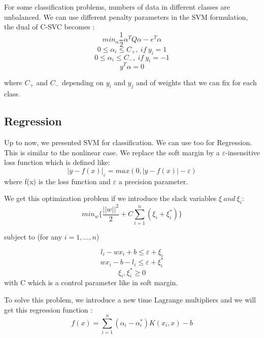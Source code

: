 For some classification problems, numbers of data in different classes are unbalanced. We can use different penalty parameters in the SVM formulation, the dual of C-SVC becomes :
\[min_{\alpha} \frac{1}{2} \alpha^TQ\alpha-e^T\alpha\]
\[0\leq \alpha_i \leq C_+,\ if\ y_i=1\]
\[0\leq \alpha_i \leq C_-,\ if\ y_i=-1\]
\[y^T\alpha=0\]

where $C_+$ and $C_-$ depending on $y_i$ and $y_j$ and of weights that we can fix for each class.

\subsection{Regression }
Up to now, we presented SVM for classification. We can use too for Regression. This is similar to the nonlinear case. We replace the soft margin by 
a $\varepsilon$-insensitive loss function which is defined like:
\[|y-f(x)|_\varepsilon = max(0,|y-f(x)|-\varepsilon)\]
where f(x) is the loss function and $\varepsilon$ a precision parameter.

We get this optimization problem if we introduce the slack variables $\xi\ and\ \xi_i$:
\[min_w \{\frac{||w||^2}{2}+C\sum_{i=1}^n(\xi_i+\xi_i^*) \}\]
\begin{center}subject to (for any $i=1,...,n$)\end{center}
\[l_i-wx_i+b\leq \varepsilon+\xi_i\]
\[wx_i-b-l_i\leq \varepsilon +\xi_i^*\]
\[\xi_i,\xi_i^* \geq 0\]
with C which is a control parameter like in soft margin. 

To solve this problem, we introduce a new time Lagrange multipliers and we will get this regression function :
\[f(x)=\sum_{i=1}^n(\alpha_i-\alpha_i^*)K(x_i,x)-b\]


 


